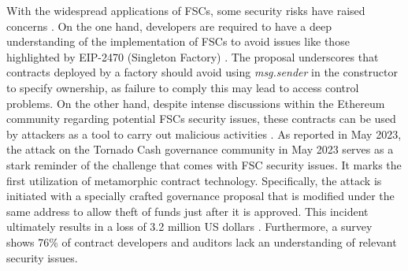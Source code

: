 \documentclass[acmsmall,screen]{acmart}
\begin{document}
	With the widespread applications of FSCs, some security risks have raised concerns \cite{eip-2470,create2-security-discussion,tornado-cash-attack,tornado-cash-attack2}. On the one hand, developers are required to have a deep understanding of the implementation of FSCs to avoid issues like those highlighted by EIP-2470 (Singleton Factory) \cite{eip-2470}. The proposal underscores that contracts deployed by a factory should avoid using \textit{msg.sender} in the constructor to specify ownership, as failure to comply this may lead to access control problems. On the other hand, despite intense discussions within the Ethereum community \cite{create2-security-discussion} regarding potential FSCs security issues, these contracts can be used by attackers as a tool to carry out malicious activities \cite{tornado-cash-attack,tornado-cash-attack2,op-stolen}. As reported in May 2023, the attack on the Tornado Cash governance community in May 2023 \cite{tornado-cash-attack2} serves as a stark reminder of the challenge that comes with FSC security issues. It marks the first utilization of metamorphic contract technology. Specifically, the attack is initiated with a specially crafted governance proposal that is modified under the same address to allow theft of funds just after it is approved. This incident ultimately results in a loss of 3.2 million US dollars \cite{tornado-cash-attack}. Furthermore, a survey \cite{twitter-survey} shows 76\% of contract developers and auditors lack an understanding of relevant security issues.
\end{document}
